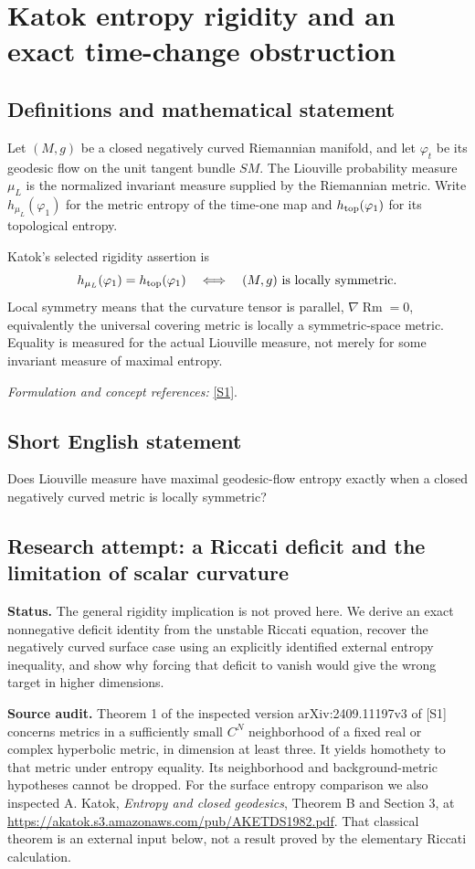 \documentclass[11pt]{article}
\begin{document}
\section*{\texorpdfstring{Katok entropy rigidity and an exact time-change obstruction}{Katok entropy rigidity and an exact time-change obstruction}}\label{20001890}
\subsection{Definitions and mathematical statement}
Let $(M,g)$ be a closed negatively curved Riemannian manifold, and let $\varphi_t$ be its geodesic flow on the unit tangent bundle $SM$. The Liouville probability measure $\mu_L$ is the normalized invariant measure supplied by the Riemannian metric. Write $h_{\mu_L}(\varphi_1)$ for the metric entropy of the time-one map and $h_{\rm top}(\varphi_1)$ for its topological entropy.

Katok's selected rigidity assertion is
\[
 h_{\mu_L}(\varphi_1)=h_{\rm top}(\varphi_1)
 \quad\Longleftrightarrow\quad (M,g)\text{ is locally symmetric}.
\]
Local symmetry means that the curvature tensor is parallel, $\nabla\operatorname{Rm}=0$, equivalently the universal covering metric is locally a symmetric-space metric. Equality is measured for the actual Liouville measure, not merely for some invariant measure of maximal entropy.
\par\smallskip\textit{Formulation and concept references:} \href{https://arxiv.org/abs/2409.11197}{[S1]}.

\subsection{Short English statement}
Does Liouville measure have maximal geodesic-flow entropy exactly when a closed negatively curved metric is locally symmetric?
\subsection{Research attempt: a Riccati deficit and the limitation of scalar curvature}
\textbf{Status.} The general rigidity implication is not proved here. We derive an exact nonnegative deficit identity from the unstable Riccati equation, recover the negatively curved surface case using an explicitly identified external entropy inequality, and show why forcing that deficit to vanish would give the wrong target in higher dimensions.

\textbf{Source audit.} Theorem 1 of the inspected version arXiv:2409.11197v3 of [S1] concerns metrics in a sufficiently small $C^N$ neighborhood of a fixed real or complex hyperbolic metric, in dimension at least three. It yields homothety to that metric under entropy equality. Its neighborhood and background-metric hypotheses cannot be dropped. For the surface entropy comparison we also inspected A. Katok, \emph{Entropy and closed geodesics}, Theorem B and Section 3, at \url{https://akatok.s3.amazonaws.com/pub/AKETDS1982.pdf}. That classical theorem is an external input below, not a result proved by the elementary Riccati calculation.
\end{document}

